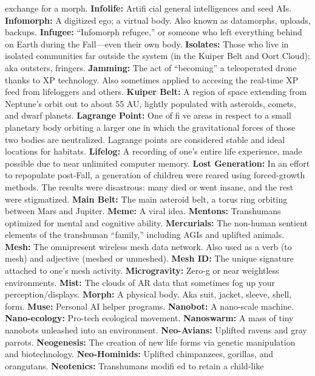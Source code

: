 exchange for a morph.
\textbf{ Infolife:} Artiﬁ cial general intelligences and seed AIs.
\textbf{ Infomorph:} A digitized ego; a virtual body. Also known 
as datamorphs, uploads, backups.
\textbf{ Infugee:} ``Infomorph refugee,'' or someone who left 
everything behind on Earth during the Fall—even their 
own body.
\textbf{ Isolates:} Those who live in isolated communities far 
outside the system (in the Kuiper Belt and Oort Cloud); 
aka outsters, fringers.
\textbf{ Jamming:} The act of ``becoming'' a teleoperated drone 
thanks to XP technology. Also sometimes applied to 
accesing the real-time XP feed from lifeloggers and others.
\textbf{ Kuiper Belt:} A region of space extending from Neptune's 
orbit out to about 55 AU, lightly populated with asteroids, 
comets, and dwarf planets.
\textbf{ Lagrange Point:} One of ﬁ ve areas in respect to a 
small planetary body orbiting a larger one in which the 
gravitational forces of those two bodies are neutralized. 
Lagrange points are considered stable and ideal locations 
for habitats.
\textbf{ Lifelog:} A recording of one's entire life experience, made 
possible due to near unlimited computer memory.
\textbf{ Lost Generation:} In an effort to repopulate post-Fall, a 
generation of children were reared using forced-growth 
methods. The results were disastrous: many died or went 
insane, and the rest were stigmatized.
\textbf{ Main Belt:} The main asteroid belt, a torus ring orbiting 
between Mars and Jupiter.
\textbf{ Meme:} A viral idea.
\textbf{ Mentons:} Transhumans optimized for mental and 
cognitive ability.
\textbf{ Mercurials:} The non-human sentient elements of the 
transhuman ``family,'' including AGIs and uplifted animals.
\textbf{ Mesh:} The omnipresent wireless mesh data network. 
Also used as a verb (to mesh) and adjective (meshed or 
unmeshed).
\textbf{ Mesh ID:} The unique signature attached to one's mesh 
activity.
\textbf{ Microgravity:} Zero-g or near weightless environments.
\textbf{ Mist:} The clouds of AR data that sometimes fog up your 
perception/displays.
\textbf{ Morph:} A physical body. Aka suit, jacket, sleeve, shell, form.
\textbf{ Muse:} Personal AI helper programs.
\textbf{ Nanobot:} A nano-scale machine.
\textbf{ Nano-ecology:} Pro-tech ecological movement.
\textbf{ Nanoswarm:} A mass of tiny nanobots unleashed into an 
environment.
\textbf{ Neo-Avians:} Uplifted ravens and gray parrots.
\textbf{ Neogenesis:} The creation of new life forms via genetic 
manipulation and biotechnology.
\textbf{ Neo-Hominids:} Uplifted chimpanzees, gorillas, and 
orangutans.
\textbf{ Neotenics:} Transhumans modiﬁ ed to retain a child-like 
